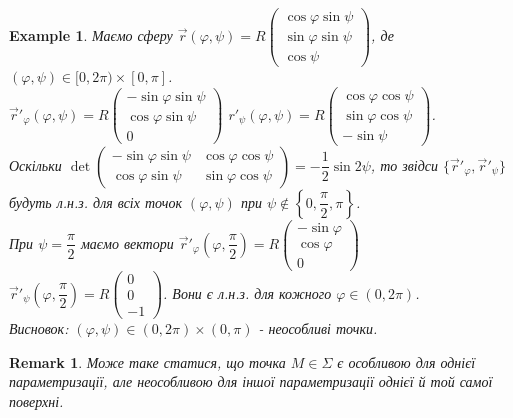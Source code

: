 \documentclass[a4paper, 10pt]{article}
\theoremstyle{theoremdd}
\theoremstyle{theoremdd}
\theoremstyle{theoremdd}
\theoremstyle{theoremdd}
\theoremstyle{theoremdd}
\newtheorem{example}[theorem]{Example}
\theoremstyle{theoremdd}
\theoremstyle{theoremdd}
\theoremstyle{theoremdd}
\theoremstyle{theoremdd}
\theoremstyle{theoremdd}
\theoremstyle{theoremdd}
\newtheorem{remark}[theorem]{Remark}
\theoremstyle{theoremdd}
\theoremstyle{theoremdd}
\theoremstyle{theoremdd}
\theoremstyle{theoremdd}
\begin{document}
\begin{example}
Маємо сферу $\vec{r}(\varphi,\psi) = R \begin{pmatrix}
\cos \varphi \sin \psi \\
\sin \varphi \sin \psi \\
\cos \psi
\end{pmatrix}$, де $(\varphi,\psi) \in [0,2\pi) \times [0,\pi]$.\\
$\vec{r}'_\varphi(\varphi,\psi) = R \begin{pmatrix}
-\sin \varphi \sin \psi \\
\cos \varphi \sin \psi \\
0
\end{pmatrix}$ \hspace{1cm} $r'_\psi(\varphi,\psi) = R \begin{pmatrix}
\cos \varphi \cos \psi \\
\sin \varphi \cos \psi \\
- \sin \psi
\end{pmatrix}$.\\
Оскільки $\det \begin{pmatrix}
-\sin \varphi \sin \psi & \cos \varphi \cos \psi \\
\cos \varphi \sin \psi & \sin \varphi \cos \psi
\end{pmatrix} = -\dfrac{1}{2} \sin 2\psi$, то звідси $\{ \vec{r}'_\varphi, \vec{r}'_\psi \}$ будуть л.н.з. для всіх точок $(\varphi,\psi)$ при $\psi \not\in \left\{ 0, \dfrac{\pi}{2}, \pi \right\}$.\\
При $\psi = \dfrac{\pi}{2}$ маємо вектори $\vec{r}'_\varphi\left(\varphi,\dfrac{\pi}{2} \right) = R \begin{pmatrix}
-\sin \varphi \\ \cos \varphi \\ 0
\end{pmatrix}$ \hspace{1cm} $\vec{r}'_\psi\left(\varphi,\dfrac{\pi}{2} \right) = R \begin{pmatrix}
0 \\ 0 \\ -1
\end{pmatrix}$. Вони є л.н.з. для кожного $\varphi \in (0,2\pi)$.\\
Висновок: $(\varphi,\psi) \in (0,2\pi) \times (0,\pi)$ - неособливі точки.
\end{example}

\begin{remark}
Може таке статися, що точка $M \in \Sigma$ є особливою для однієї параметризації, але неособливою для іншої параметризації однієї й той самої поверхні.
\end{remark}
\end{document}
